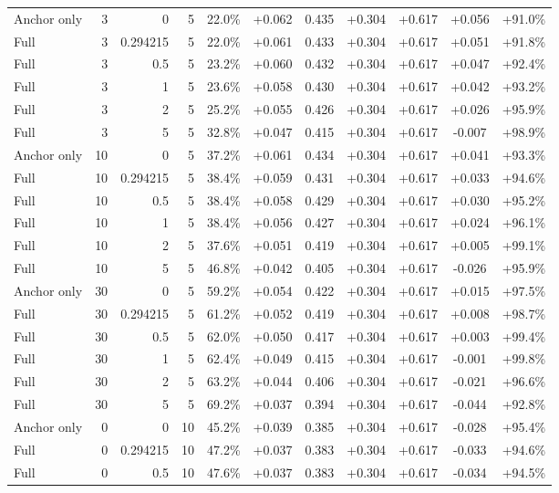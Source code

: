 \begin{table}[htbp]
\begin{tabular}{lrrrccccccc}
Anchor only & 3 & 0 & 5 & 22.0\% & +0.062 & 0.435 & +0.304 & +0.617 & +0.056 & +91.0\% \\
Full & 3 & 0.294215 & 5 & 22.0\% & +0.061 & 0.433 & +0.304 & +0.617 & +0.051 & +91.8\% \\
Full & 3 & 0.5 & 5 & 23.2\% & +0.060 & 0.432 & +0.304 & +0.617 & +0.047 & +92.4\% \\
Full & 3 & 1 & 5 & 23.6\% & +0.058 & 0.430 & +0.304 & +0.617 & +0.042 & +93.2\% \\
Full & 3 & 2 & 5 & 25.2\% & +0.055 & 0.426 & +0.304 & +0.617 & +0.026 & +95.9\% \\
Full & 3 & 5 & 5 & 32.8\% & +0.047 & 0.415 & +0.304 & +0.617 & -0.007 & +98.9\% \\
Anchor only & 10 & 0 & 5 & 37.2\% & +0.061 & 0.434 & +0.304 & +0.617 & +0.041 & +93.3\% \\
Full & 10 & 0.294215 & 5 & 38.4\% & +0.059 & 0.431 & +0.304 & +0.617 & +0.033 & +94.6\% \\
Full & 10 & 0.5 & 5 & 38.4\% & +0.058 & 0.429 & +0.304 & +0.617 & +0.030 & +95.2\% \\
Full & 10 & 1 & 5 & 38.4\% & +0.056 & 0.427 & +0.304 & +0.617 & +0.024 & +96.1\% \\
Full & 10 & 2 & 5 & 37.6\% & +0.051 & 0.419 & +0.304 & +0.617 & +0.005 & +99.1\% \\
Full & 10 & 5 & 5 & 46.8\% & +0.042 & 0.405 & +0.304 & +0.617 & -0.026 & +95.9\% \\
Anchor only & 30 & 0 & 5 & 59.2\% & +0.054 & 0.422 & +0.304 & +0.617 & +0.015 & +97.5\% \\
Full & 30 & 0.294215 & 5 & 61.2\% & +0.052 & 0.419 & +0.304 & +0.617 & +0.008 & +98.7\% \\
Full & 30 & 0.5 & 5 & 62.0\% & +0.050 & 0.417 & +0.304 & +0.617 & +0.003 & +99.4\% \\
Full & 30 & 1 & 5 & 62.4\% & +0.049 & 0.415 & +0.304 & +0.617 & -0.001 & +99.8\% \\
Full & 30 & 2 & 5 & 63.2\% & +0.044 & 0.406 & +0.304 & +0.617 & -0.021 & +96.6\% \\
Full & 30 & 5 & 5 & 69.2\% & +0.037 & 0.394 & +0.304 & +0.617 & -0.044 & +92.8\% \\
Anchor only & 0 & 0 & 10 & 45.2\% & +0.039 & 0.385 & +0.304 & +0.617 & -0.028 & +95.4\% \\
Full & 0 & 0.294215 & 10 & 47.2\% & +0.037 & 0.383 & +0.304 & +0.617 & -0.033 & +94.6\% \\
Full & 0 & 0.5 & 10 & 47.6\% & +0.037 & 0.383 & +0.304 & +0.617 & -0.034 & +94.5\% \\

\end{tabular}
\end{table}
